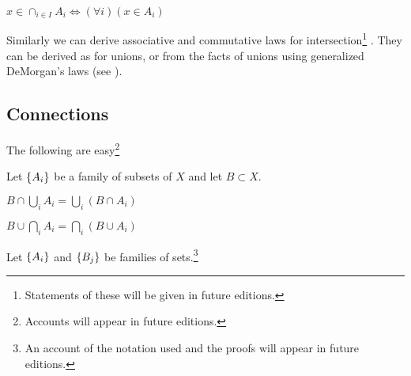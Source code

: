 \begin{proposition}
$x \in \cap _{i \in I} A_i \iff (\forall i)(x \in A_i)$\end{proposition}
Similarly we can derive associative and commutative laws for intersection\footnote{Statements of these will be given in future editions.}
.
They can be derived as for unions, or from the facts of unions using generalized DeMorgan's laws (see ).

\subsection*{Connections}

The following are easy\footnote{Accounts will appear in future editions.}

Let $\{A_i\}$ be a family of subsets of $X$ and let $B \subset X$.

\begin{proposition}
$B \cap \bigcup_{i} A_i = \bigcup_{i} (B \cap A_i)$\end{proposition}
\begin{proposition}
$B \cup \bigcap_{i} A_i = \bigcap_{i} (B \cup A_i)$\end{proposition}
Let $\{A_i\}$ and $\{B_j\}$ be families of sets.\footnote{An account of the notation used and the proofs will appear in future editions.}


